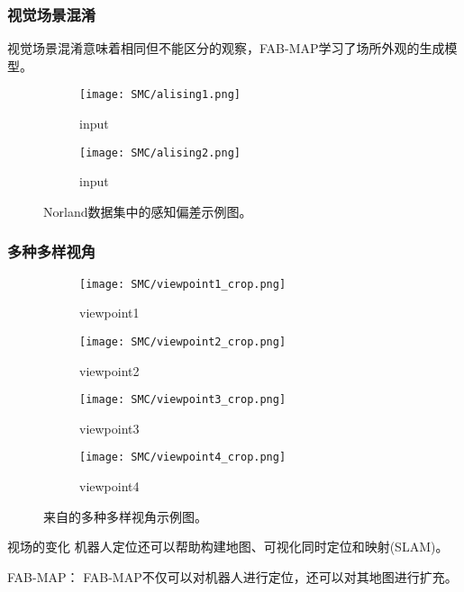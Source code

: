 \subsubsection{视觉场景混淆}
视觉场景混淆意味着相同但不能区分的观察，FAB-MAP学习了场所外观的生成模型。

\begin{figure}
	\centering
    \begin{subfigure}[h]{0.32\textwidth}
        \texttt{[image: SMC/alising1.png]}
        \caption{input}
    \end{subfigure}
	\vspace*{4mm}
    \begin{subfigure}[h]{0.32\textwidth}
        \texttt{[image: SMC/alising2.png]}
        \caption{input}
    \end{subfigure}
\caption{Norland数据集中的感知偏差示例图。}
\label{fig:alising_SMC}
\end{figure}

\subsubsection{多种多样视角}
\begin{figure}[h]
	\centering
	\begin{subfigure}[h]{0.23\textwidth}
		\texttt{[image: SMC/viewpoint1\_crop.png]}
		\caption{viewpoint1}
	\end{subfigure}
	\begin{subfigure}[h]{0.23\textwidth}
		\texttt{[image: SMC/viewpoint2\_crop.png]}
		\caption{viewpoint2}
	\end{subfigure}
	\begin{subfigure}[h]{0.23\textwidth}
		\texttt{[image: SMC/viewpoint3\_crop.png]}
		\caption{viewpoint3}
	\end{subfigure}
	\begin{subfigure}[h]{0.23\textwidth}
		\texttt{[image: SMC/viewpoint4\_crop.png]}
		\caption{viewpoint4}
	\end{subfigure}
	\caption{来自\cite{Philbin08}的多种多样视角示例图。}
	\label{fig:alising}
\end{figure}
视场的变化
机器人定位还可以帮助构建地图、可视化同时定位和映射(SLAM)\cite{Cummins2011Appearance,milford2012seqslam,Naseer2015Robust,Davison2007MonoSLAM,Engel2014LSD,Choset2001Topological,Mur2017ORB}。

FAB-MAP：\cite{Cummins2008FAB}
FAB-MAP不仅可以对机器人进行定位，还可以对其地图进行扩充。

